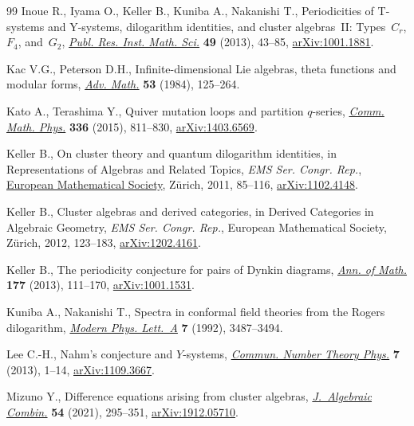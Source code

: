 \documentclass[pdftex]{sigma}
\numberwithin{equation}{section}
\theoremstyle{definition}
\begin{document}
\begin{thebibliography}{99}
Inoue R., Iyama O., Keller B., Kuniba A., Nakanishi T., Periodicities of
 {T}-systems and {Y}-systems, dilogarithm identities, and cluster
 algebras~{II}: {T}ypes~{$C_r$}, {$F_4$}, and~{$G_2$},
 \href{https://doi.org/10.4171/PRIMS/96}{\textit{Publ. Res. Inst. Math. Sci.}}
 \textbf{49} (2013), 43--85,
 \href{http://arxiv.org/abs/1001.1881}{arXiv:1001.1881}.

Kac V.G., Peterson D.H., Infinite-dimensional {L}ie algebras, theta functions
 and modular forms,
 \href{https://doi.org/10.1016/0001-8708(84)90032-X}{\textit{Adv. Math.}}
 \textbf{53} (1984), 125--264.

Kato A., Terashima Y., Quiver mutation loops and partition {$q$}-series,
 \href{https://doi.org/10.1007/s00220-014-2224-5}{\textit{Comm. Math. Phys.}}
 \textbf{336} (2015), 811--830,
 \href{http://arxiv.org/abs/1403.6569}{arXiv:1403.6569}.

Keller B., On cluster theory and quantum dilogarithm identities, in
 Representations of {A}lgebras and {R}elated {T}opics, \textit{EMS Ser. Congr. Rep.},
 \href{https://doi.org/10.4171/101-1/3}{European Mathematical Society},
 Z\"urich, 2011, 85--116,
 \href{http://arxiv.org/abs/1102.4148}{arXiv:1102.4148}.

Keller B., Cluster algebras and derived categories, in Derived {C}ategories in
 {A}lgebraic {G}eometry, \textit{EMS Ser. Congr. Rep.}, European Mathematical Society,
 Z\"urich, 2012, 123--183,
 \href{http://arxiv.org/abs/1202.4161}{arXiv:1202.4161}.

Keller B., The periodicity conjecture for pairs of {D}ynkin diagrams,
 \href{https://doi.org/10.4007/annals.2013.177.1.3}{\textit{Ann. of Math.}}
 \textbf{177} (2013), 111--170,
 \href{http://arxiv.org/abs/1001.1531}{arXiv:1001.1531}.

Kuniba A., Nakanishi T., Spectra in conformal field theories from the {R}ogers
 dilogarithm, \href{https://doi.org/10.1142/S0217732392002895}{\textit{Modern
 Phys. Lett.~A}} \textbf{7} (1992), 3487--3494.

Lee C.-H., Nahm's conjecture and {$Y$}-systems,
 \href{https://doi.org/10.4310/CNTP.2013.v7.n1.a1}{\textit{Commun. Number
 Theory Phys.}} \textbf{7} (2013), 1--14,
 \href{http://arxiv.org/abs/1109.3667}{arXiv:1109.3667}.

Mizuno Y., Difference equations arising from cluster algebras,
 \href{https://doi.org/10.1007/s10801-020-00978-9}{\textit{J.~Algebraic
 Combin.}} \textbf{54} (2021), 295--351,
 \href{http://arxiv.org/abs/1912.05710}{arXiv:1912.05710}.


\end{thebibliography}
\end{document}
